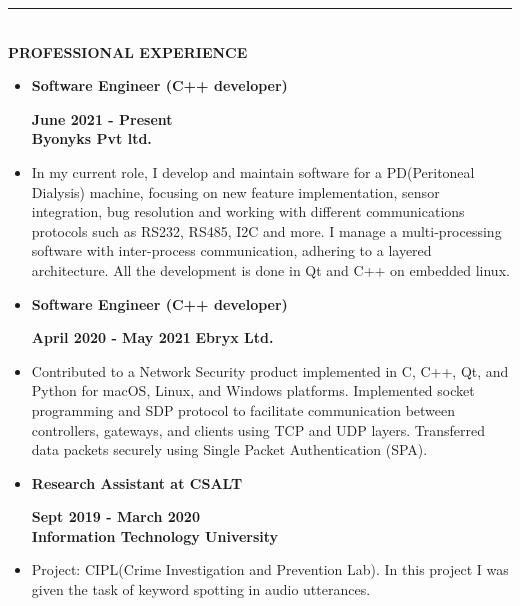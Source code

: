 \documentclass[9pt,a4paper]{article}
\newcommand{\MyHorizontalLine}{\noindent\rule{\linewidth}{1.5pt}\\}
\begin{document}
\MyHorizontalLine
	\textbf{PROFESSIONAL EXPERIENCE}
	\begin{itemize}
		\item \raggedleft\textbf{Software Engineer (C++ developer)}
		\hfill
		\raggedright\textbf{June 2021 - Present}\\
		\textbf{Byonyks Pvt ltd.}
		\item []	\justifying
		In my current role, I develop and maintain software for a PD(Peritoneal Dialysis) machine, focusing on new feature implementation, sensor integration, bug resolution and working with different communications protocols such as RS232, RS485, I2C and more. I manage a multi-processing software with inter-process communication, adhering to a layered architecture. All the development is done in Qt and C++ on embedded linux.
		\item \raggedleft\textbf{Software Engineer (C++ developer)}
		\hfill
		\raggedright\textbf{April 2020 - May 2021}
		\textbf{Ebryx Ltd.}\\
		\item[]\justifying
		 Contributed to a Network Security product implemented in C, C++, Qt, and Python for macOS, Linux, and Windows platforms. Implemented socket programming and SDP protocol to facilitate communication between controllers, gateways, and clients using TCP and UDP layers. Transferred data packets securely using Single Packet Authentication (SPA).
		\item \raggedleft\textbf{Research Assistant at CSALT}
		\hfill
		\raggedright\textbf{Sept 2019 - March 2020}\\
		\textbf{Information Technology University}
		\item[]\justifying
		Project: CIPL(Crime Investigation and Prevention Lab). In this project I was given the task of keyword spotting in audio utterances.
	\end{itemize}
\end{document}
